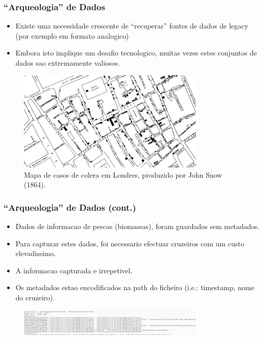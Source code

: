 \documentclass[hyperref={pdfpagelabels=true}]{beamer}
\begin{document}
\begin{frame}
\frametitle{``Arqueologia'' de Dados}

      \begin{itemize}
        \item<1->Existe uma necessidade crescente de ``recuperar'' fontes de dados de legacy (por exemplo em formato analogico)
        \item<2->Embora isto implique um desafio tecnologico, muitas vezes estes conjuntos de dados sao extremamente valiosos.%
      \end{itemize}                
    \begin{figure}   
         \includegraphics[width=0.8\textwidth]{snow.jpg}\\
         \tiny{Mapa de casos de colera em Londres, produzido por John Snow (1864).}
    \end{figure} 

\end{frame}

\begin{frame}
\frametitle{``Arqueologia'' de Dados (cont.)}

      \begin{itemize}      
        \item<1->Dados de informacao de pescas (biomassas), foram guardados sem metadados.
        \item<2->Para capturar estes dados, foi necessario efectuar cruzeiros com um custo elevadissimo.%
        \item<3->A informacao capturada e irrepetivel.%
        \item<4->Os metadados estao encodificados na path do ficheiro (i.e.: timestamp, nome do cruzeiro).%
      \end{itemize}                
    \begin{figure}   
         \includegraphics[width=0.8\textwidth]{fao.png}
    \end{figure} 
\end{frame}
\end{document}
